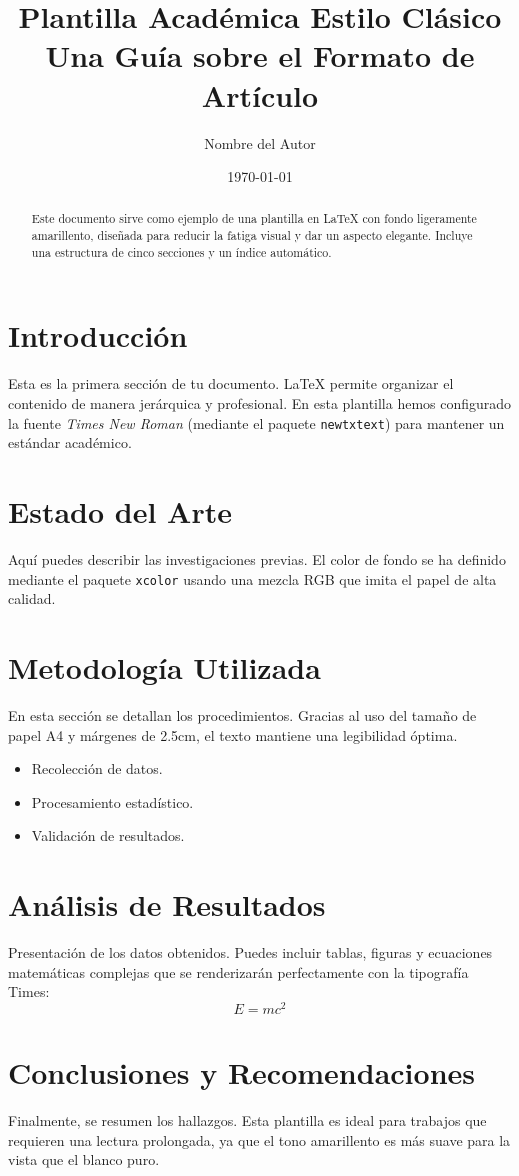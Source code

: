 \documentclass[12pt, a4paper]{article}
\title{Plantilla Académica Estilo Clásico \\ \large Una Guía sobre el Formato de Artículo}
\author{Nombre del Autor}
\date{\today}
\begin{document}
\maketitle

\begin{abstract}
Este documento sirve como ejemplo de una plantilla en LaTeX con fondo ligeramente amarillento, diseñada para reducir la fatiga visual y dar un aspecto elegante. Incluye una estructura de cinco secciones y un índice automático.
\end{abstract}

\newpage
\tableofcontents
\newpage

\section{Introducción}
Esta es la primera sección de tu documento. LaTeX permite organizar el contenido de manera jerárquica y profesional. En esta plantilla hemos configurado la fuente \textit{Times New Roman} (mediante el paquete \texttt{newtxtext}) para mantener un estándar académico.

\section{Estado del Arte}
Aquí puedes describir las investigaciones previas. El color de fondo se ha definido mediante el paquete \texttt{xcolor} usando una mezcla RGB que imita el papel de alta calidad.

\section{Metodología Utilizada}
En esta sección se detallan los procedimientos. Gracias al uso del tamaño de papel A4 y márgenes de 2.5cm, el texto mantiene una legibilidad óptima. 
\begin{itemize}
    \item Recolección de datos.
    \item Procesamiento estadístico.
    \item Validación de resultados.
\end{itemize}

\section{Análisis de Resultados}
Presentación de los datos obtenidos. Puedes incluir tablas, figuras y ecuaciones matemáticas complejas que se renderizarán perfectamente con la tipografía Times:
\begin{equation}
    E = mc^2
\end{equation}

\section{Conclusiones y Recomendaciones}
Finalmente, se resumen los hallazgos. Esta plantilla es ideal para trabajos que requieren una lectura prolongada, ya que el tono amarillento es más suave para la vista que el blanco puro.
\end{document}
